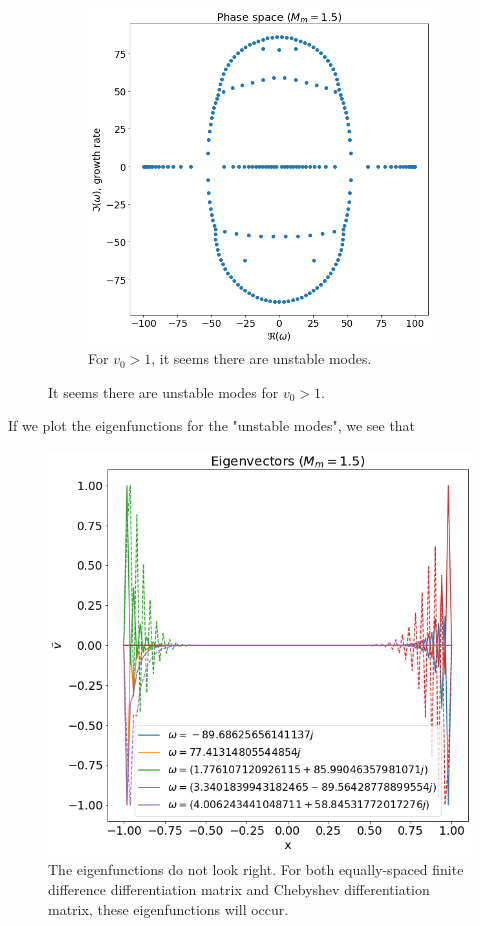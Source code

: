 \documentclass{article}
\theoremstyle{plain}
\theoremstyle{definition}
\theoremstyle{remark}
\theoremstyle{remark}
\begin{document}
\begin{figure}[H]
\begin{subfigure}[b]{0.5\linewidth}
        \includegraphics[width=\linewidth]{img/phase-space-constant-v>1.png}
        \caption{For $v_0>1$, it seems there are unstable modes.}
    \end{subfigure}
    \caption{It seems there are unstable modes for $v_0>1$.}
    \label{fig:phase-space-constant-v}
\end{figure}

If we plot the eigenfunctions for the "unstable modes", we see that
\begin{figure}[H]
    \centering
    \includegraphics[width=0.5\linewidth]{img/eigenvectors-bad.png}
    \caption{The eigenfunctions do not look right. For both equally-spaced finite difference differentiation matrix and Chebyshev differentiation matrix, these eigenfunctions will occur.}
\end{figure}
\end{document}
